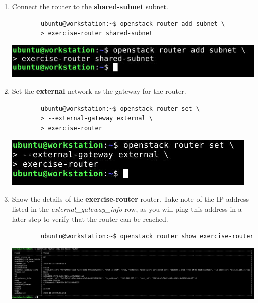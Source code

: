 \documentclass[letterpaper, 12pt]{article}
\begin{document}
\begin{enumerate}
    \item Connect the router to the \textbf{shared-subnet} subnet.
    \begin{lstlisting}
        ubuntu@workstation:~$ openstack router add subnet \
        > exercise-router shared-subnet
    \end{lstlisting}

    \begin{center}
        \includegraphics[width=\linewidth]{images/part2/step14.png}
    \end{center}

    \item Set the \textbf{external} network as the gateway for the router.
    \begin{lstlisting}
        ubuntu@workstation:~$ openstack router set \
        > --external-gateway external \
        > exercise-router
    \end{lstlisting}

    \begin{center}
        \includegraphics[width=\linewidth]{images/part2/step15.png}
    \end{center}

    \item Show the details of the \textbf{exercise-router} router. Take note of the IP address listed in the
    \textit{external\_gateway\_info} row, as you will ping this address in a later step to verify that the router can be
    reached.
    \begin{lstlisting}
        ubuntu@workstation:~$ openstack router show exercise-router
    \end{lstlisting}

    \begin{center}
        \includegraphics[width=\linewidth]{images/part2/step16.png}
    \end{center}


\end{enumerate}
\end{document}
